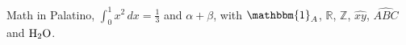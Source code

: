 \documentclass{article}
\begin{document}
Math in Palatino, $\int_0^1 x^2\,dx = \frac{1}{3}$ and $\alpha + \beta$, with
$\mathbbm{1}_A$, $\mathds{R}$, $\mathbb{Z}$, $\widehat{xy}$, $\widehat{ABC}$ and $\ce{H2O}$.
\end{document}
